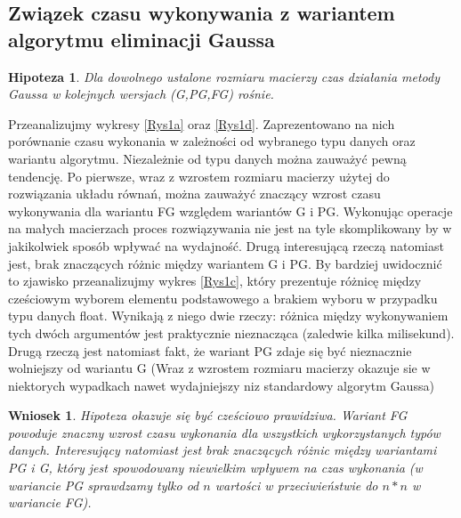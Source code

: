 \documentclass[10pt]{article}
\newtheorem{hip}{Hipoteza}
\newtheorem{wn}{Wniosek}
\begin{document}
\subsection{Związek czasu wykonywania z wariantem algorytmu eliminacji Gaussa}
\begin{hip}
	Dla dowolnego ustalone rozmiaru macierzy czas działania metody Gaussa w kolejnych wersjach (G,PG,FG) rośnie.\label{hip:1}
\end{hip}
Przeanalizujmy wykresy \ref{Rys1a} oraz \ref{Rys1d}. Zaprezentowano na nich porównanie czasu wykonania w zależności od wybranego typu danych oraz wariantu algorytmu. Niezależnie od typu danych można zauważyć pewną tendencję.
Po pierwsze, wraz z wzrostem rozmiaru macierzy użytej do rozwiązania układu równań, można zauważyć znaczący wzrost czasu wykonywania dla wariantu FG względem wariantów G i PG. Wykonując operacje na małych macierzach proces rozwiązywania nie jest na tyle skomplikowany by w jakikolwiek sposób wpływać na wydajność.
Drugą interesującą rzeczą natomiast jest, brak znaczących różnic między wariantem G i PG. By bardziej uwidocznić to zjawisko przeanalizujmy wykres \ref{Rys1c}, który prezentuje różnicę między cześciowym wyborem elementu podstawowego a brakiem wyboru w przypadku typu danych float. Wynikają z niego dwie rzeczy: różnica między wykonywaniem tych dwóch argumentów jest praktycznie nieznacząca (zaledwie kilka milisekund). Drugą rzeczą jest natomiast fakt, że wariant PG zdaje się być nieznacznie wolniejszy od wariantu G (Wraz z wzrostem rozmiaru macierzy okazuje sie w niektorych wypadkach nawet wydajniejszy niz standardowy algorytm Gaussa)
\begin{wn}
	Hipoteza okazuje się być cześciowo prawidziwa. Wariant FG powoduje znaczny wzrost czasu wykonania dla wszystkich wykorzystanych typów danych. Interesujący natomiast jest brak znaczących różnic między wariantami PG i G, który jest spowodowany niewielkim wpływem na czas wykonania (w wariancie PG sprawdzamy tylko od $n$ wartości w przeciwieństwie do $n*n$ w wariancie FG).\label{wn:1}
\end{wn}
\end{document}
